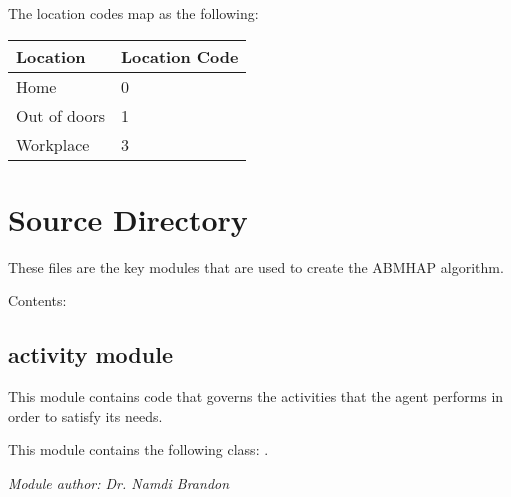 \documentclass[letterpaper,10pt,english]{sphinxmanual}
\begin{document}
The location codes map as the following:

\begin{tabulary}{\linewidth}{|L|L|}
\hline
\textsf{\relax 
Location
} & \textsf{\relax 
Location Code
}\\
\hline
Home
 & 
0
\\
\hline
Out of doors
 & 
1
\\
\hline
Workplace
 & 
3
\\
\hline\end{tabulary}



\chapter{Source Directory}
\label{index:source-directory}
These files are the key modules that are used to create the ABMHAP algorithm.

Contents:


\section{activity module}
\label{activity::doc}\label{activity:module-activity}\label{activity:activity-module}
This module contains code that governs the activities that the agent performs
in order to satisfy its needs.

This module contains the following class: {\hyperref[activity:activity.Activity]{\emph{}}}.

\emph{Module author: Dr. Namdi Brandon}
\end{document}
